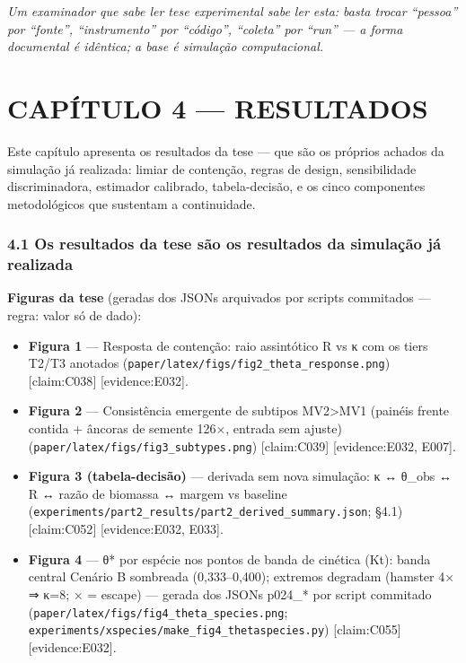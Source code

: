 \documentclass[
  12pt,
]{report}
\providecommand{\tightlist}{%
  \setlength{\itemsep}{0pt}\setlength{\parskip}{0pt}}
\begin{document}
\emph{Um examinador que sabe ler tese experimental sabe ler esta: basta
trocar ``pessoa'' por ``fonte'', ``instrumento'' por ``código'',
``coleta'' por ``run'' --- a forma documental é idêntica; a base é
simulação computacional.}

\hypertarget{capuxedtulo-4-resultados}{%
\chapter{CAPÍTULO 4 --- RESULTADOS}\label{capuxedtulo-4-resultados}}

Este capítulo apresenta os resultados da tese --- que são os próprios
achados da simulação já realizada: limiar de contenção, regras de
design, sensibilidade discriminadora, estimador calibrado,
tabela-decisão, e os cinco componentes metodológicos que sustentam a
continuidade.

\hypertarget{os-resultados-da-tese-suxe3o-os-resultados-da-simulauxe7uxe3o-juxe1-realizada}{%
\subsection{4.1 Os resultados da tese são os resultados da simulação já
realizada}\label{os-resultados-da-tese-suxe3o-os-resultados-da-simulauxe7uxe3o-juxe1-realizada}}

\textbf{Figuras da tese} (geradas dos JSONs arquivados por scripts
commitados --- regra: valor só de dado):

\begin{itemize}
\tightlist
\item
  \textbf{Figura 1} --- Resposta de contenção: raio assintótico R vs κ
  com os tiers T2/T3 anotados
  (\texttt{paper/latex/figs/fig2\_theta\_response.png}) {[}claim:C038{]}
  {[}evidence:E032{]}.
\item
  \textbf{Figura 2} --- Consistência emergente de subtipos
  MV2\textgreater MV1 (painéis frente contida + âncoras de semente 126×,
  entrada sem ajuste) (\texttt{paper/latex/figs/fig3\_subtypes.png})
  {[}claim:C039{]} {[}evidence:E032, E007{]}.
\item
  \textbf{Figura 3 (tabela-decisão)} --- derivada sem nova simulação: κ
  ↔ θ\_obs ↔ R ↔ razão de biomassa ↔ margem vs baseline
  (\texttt{experiments/part2\_results/part2\_derived\_summary.json};
  §4.1) {[}claim:C052{]} {[}evidence:E032, E033{]}.
\item
  \textbf{Figura 4} --- θ* por espécie nos pontos de banda de cinética
  (Kt): banda central Cenário B sombreada (0,333--0,400); extremos
  degradam (hamster 4× ⇒ κ=8; × = escape) --- gerada dos JSONs p024\_*
  por script commitado
  (\texttt{paper/latex/figs/fig4\_theta\_species.png};
  \texttt{experiments/xspecies/make\_fig4\_thetaspecies.py})
  {[}claim:C055{]} {[}evidence:E032{]}.
\end{itemize}
\end{document}
